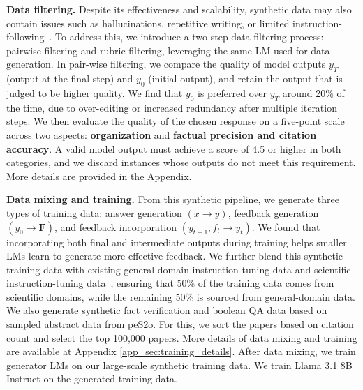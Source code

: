 \documentclass{article} %
\renewcommand{\paragraph}[1]{\noindent \textbf{#1}}
\begin{document}
\paragraph{Data filtering.}
Despite its effectiveness and scalability, synthetic data may also contain issues such as hallucinations, repetitive writing, or limited instruction-following~\citep{li-etal-2024-superfiltering}. 
To address this, we introduce a two-step data filtering process: pairwise-filtering and rubric-filtering, leveraging the same LM used for data generation. 
In pair-wise filtering, we compare the quality of model outputs $y_T$ (output at the final step) and $y_0$ (initial output), and retain the output that is judged to be higher quality. 
We find that $y_0$ is preferred over $y_T$ around 20\% of the time, due to over-editing or increased redundancy after multiple iteration steps. 
We then evaluate the quality of the chosen response on a five-point scale across two aspects: {\bf organization} and {\bf factual precision and citation accuracy}. A valid model output must achieve a score of 4.5 or higher in both categories, and we discard instances whose outputs do not meet this requirement. More details are provided in the Appendix. 

\paragraph{Data mixing and training.}
From this synthetic pipeline, we generate three types of training data: answer generation $(x \rightarrow y)$, feedback generation $(y_0 \rightarrow \mathbf{F})$, and feedback incorporation $(y_{t-1}, f_t \rightarrow y_{t})$. We found that incorporating both final and intermediate outputs during training helps smaller LMs learn to generate more effective feedback. 
We further blend this synthetic training data with existing general-domain instruction-tuning data \citep{ivison2023camels} and scientific instruction-tuning data~\citep{wadden2024sciriff}, ensuring that 50\% of the training data comes from scientific domains, while the remaining 50\% is sourced from general-domain data. 
We also generate synthetic fact verification and boolean QA data based on sampled abstract data from peS2o. For this, we sort the papers based on citation count and select the top 100,000 papers. 
More details of data mixing and training are available at Appendix \ref{app_sec:training_details}. 
After data mixing, we train generator LMs on our large-scale synthetic training data. We train Llama 3.1 8B Instruct on the generated training data. 
\end{document}
